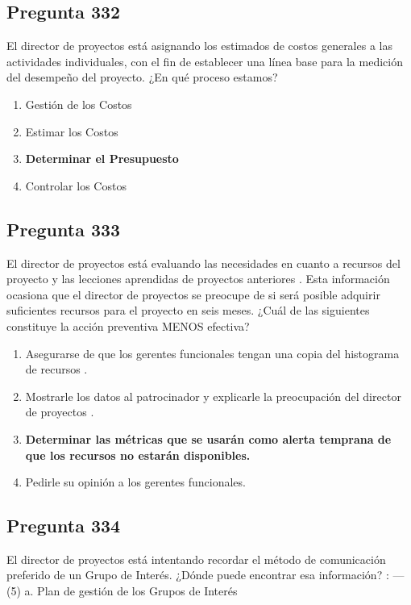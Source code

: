 \documentclass[11pt,a4paper]{article}
\begin{document}
\subsection*{Pregunta 332}
El director de proyectos está asignando los estimados de costos generales a las actividades individuales, con el fin de establecer una línea base para la medición del desempeño del proyecto. ¿En qué proceso estamos?

\begin{enumerate}[label=\alph*)]
  \item Gestión de los Costos
  \item Estimar los Costos
  \item \textbf{Determinar el Presupuesto}
  \item Controlar los Costos
\end{enumerate}

\subsection*{Pregunta 333}
El director de proyectos está evaluando las necesidades en cuanto a recursos del proyecto y las lecciones aprendidas de proyectos anteriores . Esta información ocasiona que el director de proyectos se preocupe de si será posible adquirir suficientes recursos para el proyecto en seis meses. ¿Cuál de las siguientes constituye la acción preventiva MENOS efectiva?

\begin{enumerate}[label=\alph*)]
  \item Asegurarse de que los gerentes funcionales tengan una copia del histograma de recursos .
  \item Mostrarle los datos al patrocinador y explicarle la preocupación del director de proyectos .
  \item \textbf{Determinar las métricas que se usarán como alerta temprana de que los recursos no estarán disponibles.}
  \item Pedirle su opinión a los gerentes funcionales.
\end{enumerate}

\subsection*{Pregunta 334}
El director de proyectos está intentando recordar el método de comunicación preferido de un Grupo de Interés. ¿Dónde puede encontrar esa información? : — (5) a. Plan de gestión de los Grupos de Interés
\end{document}
